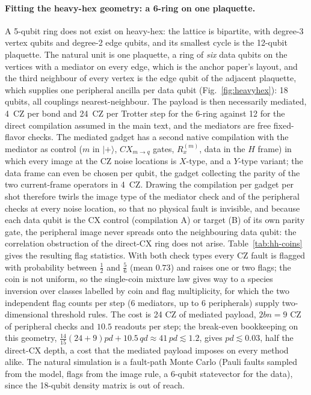 \documentclass[11pt,a4paper]{article}
\theoremstyle{remark}
\begin{document}
\paragraph{Fitting the heavy-hex geometry: a 6-ring on one plaquette.} A 5-qubit ring does not exist on heavy-hex: the lattice is bipartite, with degree-3 vertex qubits and degree-2 edge qubits, and its smallest cycle is the 12-qubit plaquette. The natural unit is one plaquette, a ring of \emph{six} data qubits on the vertices with a mediator on every edge, which is the anchor paper's layout, and the third neighbour of every vertex is the edge qubit of the adjacent plaquette, which supplies one peripheral ancilla per data qubit (Fig.~\ref{fig:heavyhex}): 18 qubits, all couplings nearest-neighbour. The payload is then necessarily mediated, 4~CZ per bond and 24~CZ per Trotter step for the 6-ring against 12 for the direct compilation assumed in the main text, and the mediators are free fixed-flavor checks. The mediated gadget has a second native compilation with the mediator as control ($m$ in $|+\rangle$, $CX_{m\to q}$ gates, $R_x^{(m)}$, data in the $H$ frame) in which every image at the CZ noise locations is $X$-type, and a $Y$-type variant; the data frame can even be chosen per qubit, the gadget collecting the parity of the two current-frame operators in 4~CZ. Drawing the compilation per gadget per shot therefore twirls the image type of the mediator check and of the peripheral checks at every noise location, so that no physical fault is invisible, and because each data qubit is the CX control (compilation A) or target (B) of its own parity gate, the peripheral image never spreads onto the neighbouring data qubit: the correlation obstruction of the direct-CX ring does not arise. Table~\ref{tab:hh-coins} gives the resulting flag statistics. With both check types every CZ fault is flagged with probability between $\tfrac12$ and $\tfrac56$ (mean $0.73$) and raises one or two flags; the coin is not uniform, so the single-coin mixture law gives way to a species inversion over classes labelled by coin and flag multiplicity, for which the two independent flag counts per step (6 mediators, up to 6 peripherals) supply two-dimensional threshold rules. The cost is 24 CZ of mediated payload, $2bn=9$ CZ of peripheral checks and $10.5$ readouts per step; the break-even bookkeeping on this geometry, $\tfrac{14}{15}(24+9)pd+10.5\,qd\approx41\,pd\lesssim1.2$, gives $pd\lesssim0.03$, half the direct-CX depth, a cost that the mediated payload imposes on every method alike. The natural simulation is a fault-path Monte Carlo (Pauli faults sampled from the model, flags from the image rule, a 6-qubit statevector for the data), since the 18-qubit density matrix is out of reach.
\end{document}
